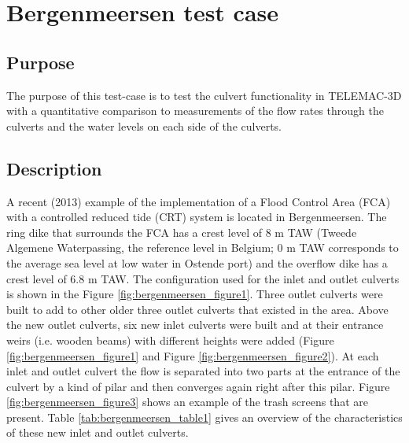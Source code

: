 
\chapter{Bergenmeersen test case}
%
%
\section{Purpose}
%
The purpose of this test-case is to test the culvert functionality in TELEMAC-3D with a quantitative comparison to
measurements of the flow rates through the culverts and the water levels on each side of the culverts.

\section{Description}
%
A recent (2013) example of the implementation of a Flood Control Area (FCA) with a controlled reduced 
tide (CRT) system is located in Bergenmeersen. 
The ring dike that surrounds the FCA has a crest level of 8 m TAW
(Tweede Algemene Waterpassing, the reference level in Belgium;
0 m TAW corresponds to the average sea level at low water in Ostende port)
and the overflow dike has a crest level of 6.8 m TAW.
The configuration used for the inlet and outlet culverts is shown in the Figure \ref{fig:bergenmeersen_figure1}.
Three outlet culverts were built to add to other older three outlet culverts that existed in the area. 
Above the new outlet culverts, six new inlet culverts were built and at their entrance weirs (i.e. wooden beams) 
with different heights were added (Figure \ref{fig:bergenmeersen_figure1} and Figure \ref{fig:bergenmeersen_figure2}). 
At each inlet and outlet culvert the flow is separated into two parts at the entrance of the culvert 
by a kind of pilar and then converges again right after this pilar. 
Figure \ref{fig:bergenmeersen_figure3} shows an example of the trash screens that are present. 
Table \ref{tab:bergenmeersen_table1} gives an overview of the characteristics of these new inlet and outlet culverts.

